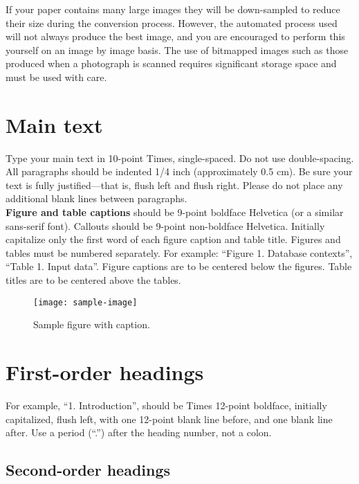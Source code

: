 \documentclass[10pt]{article}
\begin{document}
If your paper contains many large images they will be down-sampled to reduce their size during the conversion process.  However, the automated process used will not always produce the best image, and you are encouraged to perform this yourself on an image by image basis. The use of bitmapped images such as those produced when a photograph is scanned requires significant storage space and must be used with care.

\section{Main text}

Type your main text in 10-point Times, single-spaced. Do not use double-spacing. All paragraphs should be indented 1/4 inch (approximately 0.5 cm).  Be sure your text is fully justified—that is, flush left and flush right. Please do not place any additional blank lines between paragraphs. \\
\textbf{Figure and table captions} should be 9-point boldface Helvetica (or a similar sans-serif font).  Callouts should be 9-point non-boldface Helvetica. Initially capitalize only the first word of each figure caption and table title. Figures and tables must be numbered separately. For example: ``Figure 1. Database contexts'', ``Table 1. Input data''. Figure captions are to be centered below the figures. Table titles are to be centered above the tables.

\begin{figure}[thb]
    \centering
    \texttt{[image: sample-image]}
    \caption{Sample figure with caption.}
    \label{fig: sample-figure}       %
\end{figure}

\section{First-order headings}

For example, “1. Introduction”, should be Times 12-point boldface, initially capitalized, flush left, with one 12-point blank line before, and one blank line after. Use a period (“.”) after the heading number, not a colon.

\subsection{Second-order headings}
\end{document}
